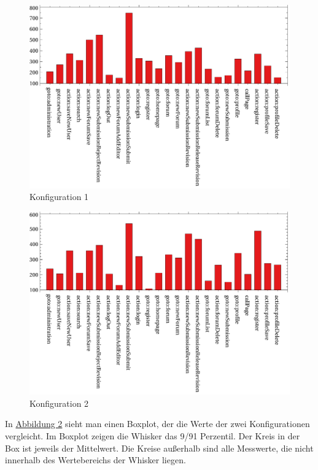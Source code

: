 \begin{figure}[H]
	\includegraphics[width=\linewidth]{graphics/30worstcase.pdf}
	\caption{Konfiguration 1}
	\label{fig:worst30}	
\end{figure}
\begin{figure}[H]
	\includegraphics[width=\linewidth]{graphics/50worstcase.pdf}
	\caption{Konfiguration 2}
	\label{fig:worst50}	
\end{figure}

In \hyperref[fig:boxplot]{Abbildung 2} sieht man einen Boxplot, der die Werte der zwei Konfigurationen vergleicht. Im Boxplot zeigen die Whisker das 9/91 Perzentil. Der Kreis in der Box ist jeweils der Mittelwert. Die Kreise außerhalb sind alle Messwerte, die nicht innerhalb des Wertebereichs der Whisker liegen.

